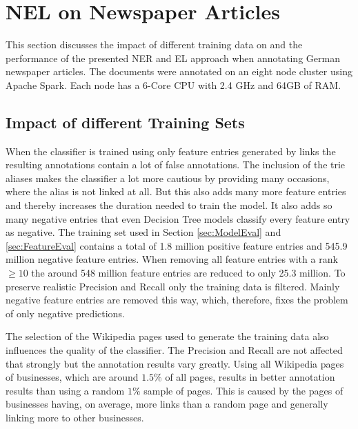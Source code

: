 \section{NEL on Newspaper Articles}
\label{sec:NELEval}
This section discusses the impact of different training data on and the performance of the presented NER and EL approach when annotating German newspaper articles. The documents were annotated on an eight node cluster using Apache Spark. Each node has a 6-Core CPU with 2.4 GHz and 64GB of RAM.\par

\subsection*{Impact of different Training Sets}
When the classifier is trained using only feature entries generated by links the resulting annotations contain a lot of false annotations. The inclusion of the trie aliases makes the classifier a lot more cautious by providing many occasions, where the alias is not linked at all. But this also adds many more feature entries and thereby increases the duration needed to train the model. It also adds so many negative entries that even Decision Tree models classify every feature entry as negative. The training set used in Section \ref{sec:ModelEval} and \ref{sec:FeatureEval} contains a total of 1.8 million positive feature entries and 545.9 million negative feature entries. When removing all feature entries with a rank $\geq 10$ the around 548 million feature entries are reduced to only 25.3 million. To preserve realistic Precision and Recall only the training data is filtered. Mainly negative feature entries are removed this way, which, therefore, fixes the problem of only negative predictions.\par
The selection of the Wikipedia pages used to generate the training data also influences the quality of the classifier. The Precision and Recall are not affected that strongly but the annotation results vary greatly. Using all Wikipedia pages of businesses, which are around $1.5\%$ of all pages, results in better annotation results than using a random $1\%$ sample of pages. This is caused by the pages of businesses having, on average, more links than a random page and generally linking more to other businesses.\par

